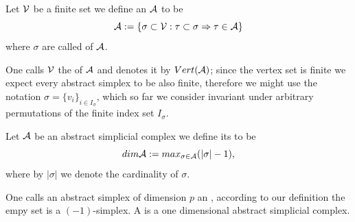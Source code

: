 \documentclass[../1.tex]{subfiles}
\begin{document}
    \begin{defn}
        Let $\mathcal{V}$ be a finite set we define an  $\mathcal{A}$ to be 
        \[\mathcal{A}:=\{ \sigma  \subset \mathcal{V} : \tau \subset \sigma \Rightarrow \tau \in \mathcal{A} \}\] 
        where $\sigma$ are called  of $\mathcal{A}$.
    \end{defn}
    
    One calls $\mathcal{V}$ the  of $\mathcal{A}$ and denotes it by $Vert(\mathcal{A})$; since the vertex
    set is finite we expect every abstract simplex to be also finite, therefore we might use the notation $\sigma = \{ v_i \}_{i \in I_\sigma}$,
    which so far we consider invariant under arbitrary permutations of the finite index set $I_\sigma$.

    \begin{defn}
        Let $\mathcal{A}$ be an abstract simplicial complex we define its  to be
        \[ dim \mathcal{A} := max_{\sigma \in \mathcal{A}}(|\sigma|-1), \]
        where by $|\sigma|$ we denote the cardinality of $\sigma$.
    \end{defn}

    One calls an abstract simplex of dimension $p$ an , according to our
    definition the empy set is a $(-1)$-simplex. A  is a one dimensional abstract simplicial complex.




\end{document}
